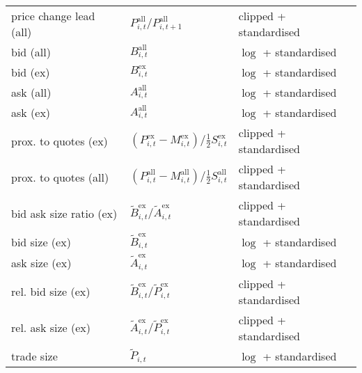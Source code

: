 \begin{table}[H]
\begin{threeparttable}
\begin{tabular}{@{}lll@{}}
            price change lead (all) & $P_{i, t}^{\text{all}}/P_{i, t+1}^{\text{all}}$\tnote{*}                                         & clipped + standardised          \\
            bid (all)               & $B_{i, t}^{\text{all}}$                                                                          & $\log$ + standardised          \\
            bid (ex)                & $B_{i, t}^{\text{ex}}$                                                                           & $\log$ + standardised          \\
            ask (all)               & $A_{i, t}^{\text{all}}$                                                                          & $\log$ + standardised          \\
            ask (ex)                & $A_{i, t}^{\text{all}}$                                                                          & $\log$ + standardised          \\
            prox. to quotes (ex)    & $\left(P_{i, t}^{\text{ex}}- M_{i, t}^{\text{ex}}\right) / \tfrac{1}{2} S_{i, t}^{\text{ex}}$    & clipped + standardised          \\
            prox. to quotes (all)   & $\left(P_{i, t}^{\text{all}}- M_{i, t}^{\text{all}}\right) / \tfrac{1}{2} S_{i, t}^{\text{all}}$ & clipped + standardised          \\
            bid ask size ratio (ex) & $\tilde{B}_{i, t}^{\text{ex}}/\tilde{A}_{i, t}^{\text{ex}}$                                      & clipped + standardised          \\
            bid size (ex)           & $\tilde{B}_{i, t}^{\text{ex}}$                                                                   & $\log$ + standardised          \\
            ask size (ex)           & $\tilde{A}_{i, t}^{\text{ex}}$                                                                   & $\log$ + standardised          \\
            rel. bid size (ex)      & $\tilde{B}_{i, t}^{\text{ex}}/\tilde{P}_{i, t}^{\text{ex}}$                                      & clipped + standardised           \\
            rel. ask size (ex)      & $\tilde{A}_{i, t}^{\text{ex}}/\tilde{P}_{i, t}^{\text{ex}}$                                      & clipped + standardised           \\
            trade size              & $\tilde{P}_{i, t}$                                                                               & $\log$ + standardised           \\

\end{tabular}
\end{threeparttable}
\end{table}
